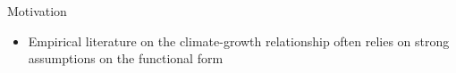\documentclass[preview]{standalone}
\begin{document}
    \selectfont

\begin{center}
\begin{block}{Motivation} \begin{itemize} \item Empirical literature on the climate-growth relationship often relies on strong assumptions on the functional form \end{itemize}\end{block}
\end{center}
\end{document}
